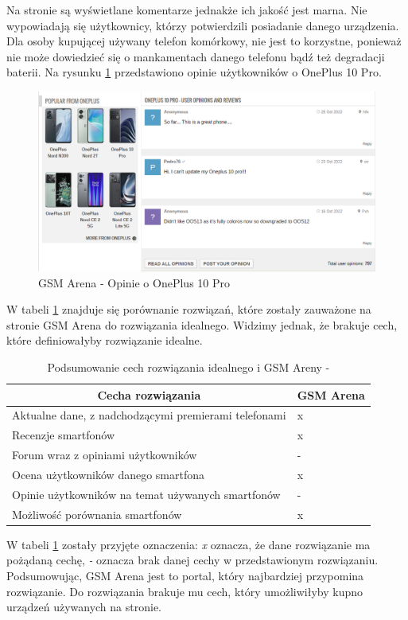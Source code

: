 Na stronie są wyświetlane komentarze jednakże ich jakość jest marna. Nie wypowiadają się użytkownicy, którzy potwierdzili posiadanie danego urządzenia. Dla osoby kupującej używany telefon komórkowy, nie jest to korzystne, ponieważ nie może dowiedzieć się o mankamentach danego telefonu bądź też degradacji baterii. Na rysunku \ref{GSM_Arena_5} przedstawiono opinie użytkowników o OnePlus 10 Pro.
\begin{figure}[H]
    \centering
    \includegraphics[width=15cm]{img/GSM Arena/Comments.png}
    \caption{GSM Arena - Opinie o OnePlus 10 Pro}
    \label{GSM_Arena_5}
\end{figure}

W tabeli \ref{comparison_gsm_arena} znajduje się porównanie rozwiązań, które zostały zauważone na stronie GSM Arena do rozwiązania idealnego. Widzimy jednak, że brakuje cech, które definiowałyby rozwiązanie idealne.
\begin{table}[H]
\centering
\begin{tabular}{|l|l|}
    \hline
    \multicolumn{1}{|c|}{Cecha rozwiązania}    & \multicolumn{1}{c|}{GSM Arena} \\ \hline
    Aktualne dane, z nadchodzącymi premierami telefonami & x                             \\ \hline
    Recenzje smartfonów                                  & x                                \\ \hline
    Forum wraz z opiniami użytkowników                   & -                                \\ \hline
    Ocena użytkowników danego smartfona                  & x                             \\ \hline
    Opinie użytkowników na temat używanych smartfonów    & -                                 \\ \hline
    Możliwość porównania smartfonów                      & x                                \\ \hline
\end{tabular}
\caption{Podsumowanie cech rozwiązania idealnego i GSM Areny -}
\label{comparison_gsm_arena}
\end{table}
W tabeli \ref{comparison_gsm_arena} zostały przyjęte oznaczenia: \textit{x} oznacza, że dane rozwiązanie ma pożądaną cechę, \textit{-} oznacza brak danej cechy w przedstawionym rozwiązaniu.
Podsumowując, GSM Arena jest to portal, który najbardziej przypomina rozwiązanie. Do rozwiązania brakuje mu cech, który umożliwiłyby kupno urządzeń używanych na stronie.

